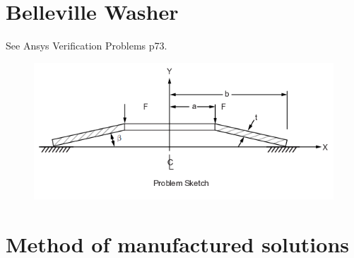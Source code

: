 \documentclass[10pt,letterpaper]{report}
\numberwithin{equation}{chapter}
\begin{document}
\chapter{Belleville Washer}

See Ansys Verification Problems p73.
\begin{figure}[!h]
\centering
\includegraphics[width=0.7\linewidth]{./Belleville}
\caption{}
\label{fig:Belleville}
\end{figure}


\chapter{Method of manufactured solutions}
\end{document}
